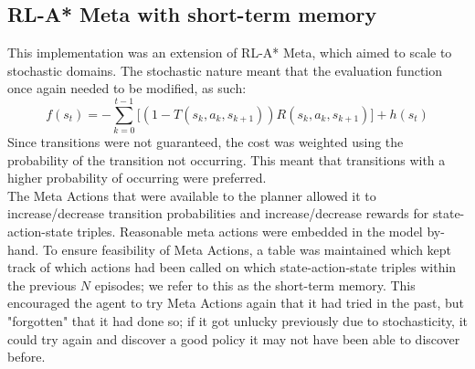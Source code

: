 \subsection{RL-A* Meta with short-term memory}
\label{sec:342}
This implementation was an extension of RL-A* Meta, which aimed to scale to stochastic domains. The stochastic nature meant that the evaluation function once again needed to be modified, as such:
\begin{equation}
\label{eqn:astarevalsast}
f(s_t) = -\sum_{k=0}^{t-1}\Bigg[(1-T(s_k, a_k, s_{k+1}))R(s_k, a_k, s_{k+1})\Bigg] + h(s_t)
\end{equation}
Since transitions were not guaranteed, the cost was weighted using the probability of the transition not occurring. This meant that transitions with a higher probability of occurring were preferred.
\\ The Meta Actions that were available to the planner allowed it to increase/decrease transition probabilities and increase/decrease rewards for state-action-state triples. Reasonable meta actions were embedded in the model by-hand. 
To ensure feasibility of Meta Actions, a table was maintained which kept track of which actions had been called on which state-action-state triples within the previous $N$ episodes; we refer to this as the short-term memory. This encouraged the agent to try Meta Actions again that it had tried in the past, but "forgotten" that it had done so; if it got unlucky previously due to stochasticity, it could try again and discover a good policy it may not have been able to discover before.
